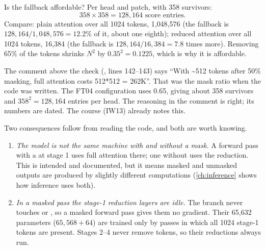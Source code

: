 \begin{worked}[label={we:esa:fallback}]{Is the fallback affordable?}
Per head and patch, with 358 survivors:
\[
  358\times358 = 128{,}164 \text{ score entries}.
\]
Compare: plain attention over all 1024 tokens, 1{,}048{,}576 (the fallback is
$128{,}164/1{,}048{,}576 = 12.2\%$ of it, about one eighth); reduced attention over all 1024 tokens,
16{,}384 (the fallback is $128{,}164/16{,}384 = 7.8$ times more). Removing 65\% of the tokens
shrinks $N^2$ by $0.35^2 = 0.1225$, which is why it is affordable.
\end{worked}

\begin{sourcenote}
The comment above the check (, lines 142--143) says ``With
\textasciitilde512 tokens after 50\% masking, full attention costs 512*512 = 262K''. That was the
mask ratio when the code was written. The FT04 configuration uses 0.65, giving about 358 survivors
and $358^2 = 128{,}164$ entries per head. The reasoning in the comment is right; its numbers are
dated. The course (IW13) already notes this.
\end{sourcenote}

Two consequences follow from reading the code, and both are worth knowing.
\begin{enumerate}
  \item \emph{The model is not the same machine with and without a mask.} A forward pass with a
   at stage 1 uses full attention there; one without uses the reduction. This is
  intended and documented, but it means masked and unmasked outputs are produced by slightly
  different computations (\cref{ch:inference} shows how inference uses both).
  \item \emph{In a masked pass the stage-1 reduction layers are idle.} The  branch never
  touches  or , so a masked forward pass gives them
  no gradient. Their 65{,}632 parameters ($65{,}568 + 64$) are trained only by passes in which all
  1024 stage-1 tokens are present. Stages 2--4 never remove tokens, so their reductions always run.
\end{enumerate}


